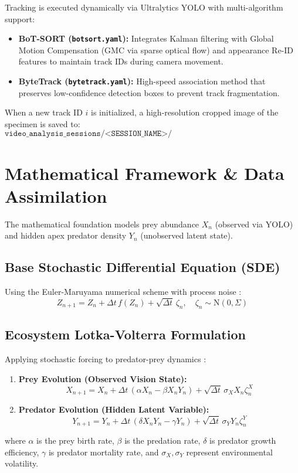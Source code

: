 \documentclass[11pt,a4paper]{article}
\begin{document}
Tracking is executed dynamically via Ultralytics YOLO with multi-algorithm support:
\begin{itemize}
    \item \textbf{BoT-SORT (\texttt{botsort.yaml}):} Integrates Kalman filtering with Global Motion Compensation (GMC via sparse optical flow) and appearance Re-ID features to maintain track IDs during camera movement.
    \item \textbf{ByteTrack (\texttt{bytetrack.yaml}):} High-speed association method that preserves low-confidence detection boxes to prevent track fragmentation.
\end{itemize}

When a new track ID $i$ is initialized, a high-resolution cropped image of the specimen is saved to:
\begin{equation}
\texttt{video\_analysis\_sessions/<SESSION\_NAME>/fish\_images/<SPECIES>\_id<i>.png}
\end{equation}

\section{Mathematical Framework \& Data Assimilation}
The mathematical foundation models prey abundance $X_n$ (observed via YOLO) and hidden apex predator density $Y_n$ (unobserved latent state).

\subsection{Base Stochastic Differential Equation (SDE)}
Using the Euler-Maruyama numerical scheme with process noise \cite{sprungk2023}:
\begin{equation}
Z_{n+1} = Z_n + \Delta t \, f(Z_n) + \sqrt{\Delta t} \, \zeta_n, \quad \zeta_n \sim \mathrm{N}(0, \Sigma)
\end{equation}

\subsection{Ecosystem Lotka-Volterra Formulation}
Applying stochastic forcing to predator-prey dynamics \cite{sprungk2023}:
\begin{enumerate}
    \item \textbf{Prey Evolution (Observed Vision State):}
    \begin{equation}
    X_{n+1} = X_n + \Delta t \, (\alpha X_n - \beta X_n Y_n) + \sqrt{\Delta t} \, \sigma_X X_n \zeta_n^X
    \end{equation}
    \item \textbf{Predator Evolution (Hidden Latent Variable):}
    \begin{equation}
    Y_{n+1} = Y_n + \Delta t \, (\delta X_n Y_n - \gamma Y_n) + \sqrt{\Delta t} \, \sigma_Y Y_n \zeta_n^Y
    \end{equation}
\end{enumerate}
where $\alpha$ is the prey birth rate, $\beta$ is the predation rate, $\delta$ is predator growth efficiency, $\gamma$ is predator mortality rate, and $\sigma_X, \sigma_Y$ represent environmental volatility.
\end{document}
